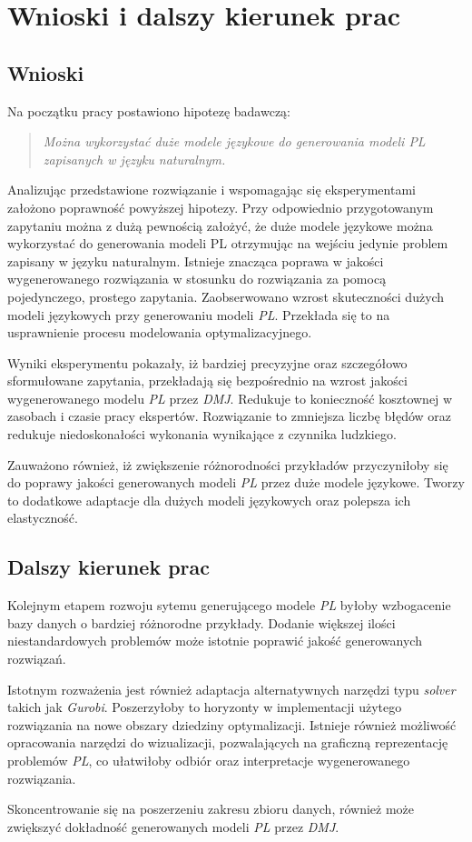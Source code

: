 
\chapter{Wnioski i dalszy kierunek prac}

\section{Wnioski}
Na początku pracy postawiono hipotezę badawczą:
\begin{quote}
\textit{Można wykorzystać duże modele językowe do generowania modeli PL zapisanych w języku naturalnym.}
\end{quote}

Analizując przedstawione rozwiązanie i wspomagając się eksperymentami założono poprawność powyższej hipotezy. Przy odpowiednio przygotowanym zapytaniu można z dużą pewnością założyć, że duże modele językowe można wykorzystać do generowania modeli PL otrzymując na wejściu jedynie problem zapisany w języku naturalnym. Istnieje znacząca poprawa w jakości wygenerowanego rozwiązania w stosunku do rozwiązania za pomocą pojedynczego, prostego zapytania. Zaobserwowano wzrost skuteczności dużych modeli językowych przy generowaniu modeli \textit{PL}. Przekłada się to na usprawnienie procesu modelowania optymalizacyjnego. 

Wyniki eksperymentu pokazały, iż bardziej precyzyjne oraz szczegółowo sformułowane zapytania, przekładają się bezpośrednio na wzrost jakości wygenerowanego modelu \textit{PL} przez \textit{DMJ}. Redukuje to konieczność kosztownej w zasobach i czasie pracy ekspertów. Rozwiązanie to zmniejsza liczbę błędów oraz redukuje niedoskonałości wykonania wynikające z czynnika ludzkiego. 

Zauważono również, iż zwiększenie różnorodności przykładów przyczyniłoby się do poprawy jakości generowanych modeli \textit{PL} przez duże modele językowe. Tworzy to dodatkowe adaptacje dla dużych modeli językowych oraz polepsza ich elastyczność.

\section{Dalszy kierunek prac}

Kolejnym etapem rozwoju sytemu generującego modele \textit{PL} byłoby wzbogacenie bazy danych o bardziej różnorodne przykłady. Dodanie większej ilości niestandardowych problemów może istotnie poprawić jakość generowanych rozwiązań.

Istotnym rozważenia jest również adaptacja alternatywnych narzędzi typu \textit{solver} takich jak \textit{Gurobi}. Poszerzyłoby to horyzonty w implementacji użytego rozwiązania na nowe obszary dziedziny optymalizacji. Istnieje również możliwość opracowania narzędzi do wizualizacji, pozwalających na graficzną reprezentację problemów \textit{PL}, co ułatwiłoby odbiór oraz interpretacje wygenerowanego rozwiązania. 

Skoncentrowanie się na poszerzeniu zakresu zbioru danych, również może zwiększyć dokładność generowanych modeli \textit{PL} przez \textit{DMJ}. 